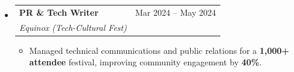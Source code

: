 \documentclass[a4paper,10pt]{article}
\makeatletter
\newcommand{\resumeItem}[1]{
    \item\normalsize{
        #1\vspace{-2.5pt}
    }
}
\newcommand{\resumeSubheading}[4]{
    \vspace{-3pt}\item
    \begin{tabular*}{0.97\textwidth}{l@{\extracolsep{\fill}}r}
        \textbf{#1} & #2 \\
        \textit{#3} & \textit{#4} \\
    \end{tabular*}\vspace{-5pt}
}
\newcommand{\resumeSubHeadingListStart}{
    \begin{itemize}[leftmargin=*,noitemsep,topsep=0pt]
}
\newcommand{\resumeSubHeadingListEnd}{
    \end{itemize}\vspace{-3pt}
}
\newcommand{\resumeItemListStart}{
    \begin{itemize}[noitemsep,topsep=0pt]
}
\newcommand{\resumeItemListEnd}{
    \end{itemize}\vspace{-1pt}
}
\makeatother
\begin{document}
\resumeSubHeadingListStart

\resumeSubheading
    {\textbf{PR \& Tech Writer}}
    {Mar 2024 -- May 2024}
    {Equinox (Tech-Cultural Fest)}
    {}

\resumeItemListStart

    \resumeItem{
        Managed technical communications and public relations for a
        \textbf{1,000+ attendee} festival, improving community engagement
        by \textbf{40\%}.
    }

\resumeItemListEnd

\resumeSubHeadingListEnd
\end{document}
